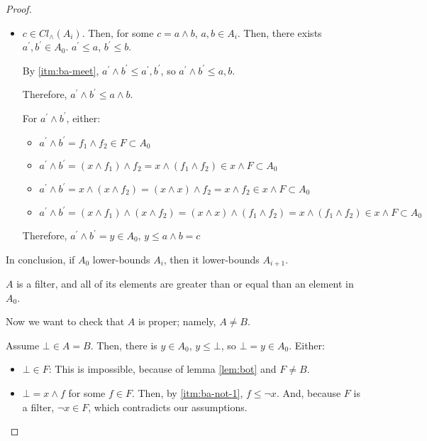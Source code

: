 \documentclass[notitlepage,a4paper]{article}
\begin{document}
\begin{enumerate}
\begin{proof}
\begin{description}
\begin{itemize}
\begin{itemize}
                     \item $c \in Cl_{∧}(A_i)$. Then, for some $c = a ∧ b$,
                       $a, b \in A_i$. Then, there exists $a^\prime, b^\prime \in A_0$.
                       $a^\prime ≤ a$, $b^\prime ≤ b$.

                       By \ref{itm:ba-meet}, $a^\prime ∧ b^\prime ≤ a^\prime, b^\prime$,
                       so $a^\prime ∧ b^\prime ≤ a, b$.

                       Therefore, $a^\prime ∧ b^\prime ≤ a ∧ b$.

                       For $a^\prime ∧ b^\prime$, either:

                       \begin{itemize}
                         \item $a^\prime ∧ b^\prime = f_1 ∧ f_2 ∈ F \subset A_0$
                         \item $a^\prime ∧ b^\prime = (x ∧ f_1) ∧ f_2 = x ∧ (f_1 ∧ f_2) ∈ x ∧ F \subset A_0$
                         \item $a^\prime ∧ b^\prime = x ∧ (x ∧ f_2) = (x ∧ x) ∧ f_2 = x ∧ f_2 ∈ x ∧ F \subset A_0$
                         \item $a^\prime ∧ b^\prime = (x ∧ f_1) ∧ (x ∧ f_2) = (x ∧ x) ∧ (f_1 ∧ f_2) = x ∧ (f_1 ∧ f_2) ∈ x ∧ F \subset A_0$
                       \end{itemize}

                       Therefore, $a^\prime ∧ b^\prime = y ∈ A_0$, $y ≤ a ∧ b = c$
                  \end{itemize}

                   In conclusion, if $A_{0}$ lower-bounds $A_{i}$, then
                   it lower-bounds $A_{i+1}$.
               \end{itemize}
           \end{description}

           $A$ is a filter, and all of its elements are greater than or
           equal than an element in $A_0$.
           
           Now we want to check that $A$ is proper; namely, $A ≠ B$.

           Assume $⊥ \in A = B$. Then, there is $y \in A_0$, $y ≤ ⊥$,
           so $⊥ = y \in A_0$. Either:

           \begin{itemize}
             \item $⊥ \in F$: This is impossible, because of lemma \ref{lem:bot} and $F \neq B$.
             \item $⊥ = x ∧ f$ for some $f ∈ F$. Then, by \ref{itm:ba-not-1},
               $f ≤ ¬x$. And, because $F$ is a filter,
               $¬x \in F$, which contradicts our assumptions.
           \end{itemize}


\end{proof}
\end{enumerate}
\end{document}
